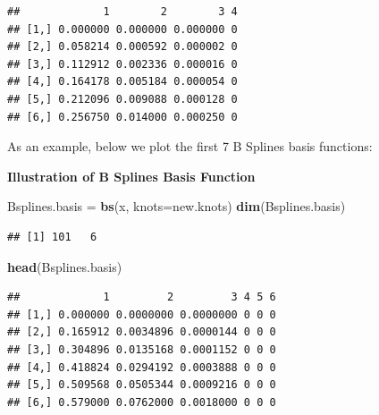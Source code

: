\documentclass[
]{book}
\newenvironment{Shaded}{\begin{snugshade}}{\end{snugshade}}
\newcommand{\AttributeTok}[1]{\textcolor[rgb]{0.13,0.29,0.53}{#1}}
\newcommand{\FunctionTok}[1]{\textcolor[rgb]{0.13,0.29,0.53}{\textbf{#1}}}
\newcommand{\NormalTok}[1]{#1}
\newcommand{\OtherTok}[1]{\textcolor[rgb]{0.56,0.35,0.01}{#1}}
\begin{document}
\begin{verbatim}
##             1        2        3 4
## [1,] 0.000000 0.000000 0.000000 0
## [2,] 0.058214 0.000592 0.000002 0
## [3,] 0.112912 0.002336 0.000016 0
## [4,] 0.164178 0.005184 0.000054 0
## [5,] 0.212096 0.009088 0.000128 0
## [6,] 0.256750 0.014000 0.000250 0
\end{verbatim}

As an example, below we plot the first 7 B Splines basis functions:

\textbf{Illustration of B Splines Basis Function}

\begin{Shaded}
\begin{Highlighting}[]
\NormalTok{Bsplines.basis }\OtherTok{=} \FunctionTok{bs}\NormalTok{(x, }\AttributeTok{knots=}\NormalTok{new.knots)}
\FunctionTok{dim}\NormalTok{(Bsplines.basis)}
\end{Highlighting}
\end{Shaded}

\begin{verbatim}
## [1] 101   6
\end{verbatim}

\begin{Shaded}
\begin{Highlighting}[]
\FunctionTok{head}\NormalTok{(Bsplines.basis)}
\end{Highlighting}
\end{Shaded}

\begin{verbatim}
##             1         2         3 4 5 6
## [1,] 0.000000 0.0000000 0.0000000 0 0 0
## [2,] 0.165912 0.0034896 0.0000144 0 0 0
## [3,] 0.304896 0.0135168 0.0001152 0 0 0
## [4,] 0.418824 0.0294192 0.0003888 0 0 0
## [5,] 0.509568 0.0505344 0.0009216 0 0 0
## [6,] 0.579000 0.0762000 0.0018000 0 0 0
\end{verbatim}
\end{document}
